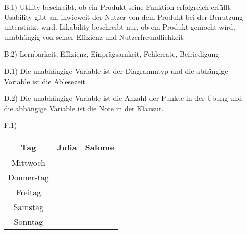 \documentclass[12pt]{scrartcl}
\begin{document}
\exercise{}
    \begin{itemize}
        \item[B.1)]
            Utility beschreibt, ob ein Produkt seine Funktion erfolgreich erfüllt.
            Usability gibt an, inwieweit der Nutzer von dem Produkt bei der Benutzung unterstützt wird.
            Likability beschreibt nur, ob ein Produkt gemocht wird, unabhängig von seiner Effizienz und Nutzerfreundlichkeit.
        \item[B.2)]Lernbarkeit, Effizienz, Einprägsamkeit, Fehlerrate, Befriedigung 
    \end{itemize}

\setcounter{enumi}{4}
\exercise{}
\begin{itemize}
    \item[D.1)] Die unabhängige Variable ist der Diagrammtyp und die abhängige Variable ist die Ablesezeit.
    \item[D.2)] Die unabhängige Variable ist die Anzahl der Punkte in der Übung und die abhängige Variable ist die Note in der Klausur.
\end{itemize}

\exercise{}

\exercise{}
\begin{itemize}
    \item[F.1)] \, \\
        \begin{tabular}{c c c}
            Tag & Julia & Salome\\ \hline
            Mittwoch & & \\ \hline
            Donnerstag & & \\ \hline
            Freitag & & \\ \hline
            Samstag & & \\ \hline
            Sonntag & & \\ \hline
        \end{tabular}
\end{itemize}
        
\end{document}
